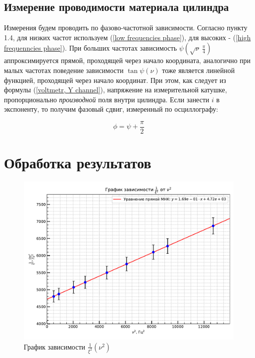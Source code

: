 \documentclass[a4paper, 12pt]{article} %
\begin{document}
\subsection{Измерение проводимости материала цилиндра}

Измерения будем проводить по фазово-частотной зависимости. Согласно пункту 1.4, для низких частот используем (\ref{low frequencies phase}), для высоких - (\ref{high frequenncies phase}). При больших частотах зависимость $\psi(\sqrt{\nu} \ \frac{\pi}{4})$ аппроксимируется прямой, проходящей через начало координата, аналогично при малых частотах поведение зависимости $\tan{\psi} (\nu)$ тоже является линейной функцией, проходящей через начало координат. При этом, как следует из формулы (\ref{voltmetr, Y channel}), напряжение на измерительной катушке, пропорционально \textit{производной} поля внутри цилиндра. Если занести $i$ в экспоненту, то получим фазовый сдвиг, измеренный по осциллографу:

\begin{equation}
    \phi = \psi + \frac{\pi}{2}
\end{equation}

\newpage

\section{Обработка результатов}

\begin{figure}[h!]
    \centering
    \includegraphics[width=0.95\linewidth]{skin1.pdf}
    \caption{График зависимости $\frac{1}{\xi^2} (\nu^2)$}
    \label{skin 1}
\end{figure}
\end{document}

